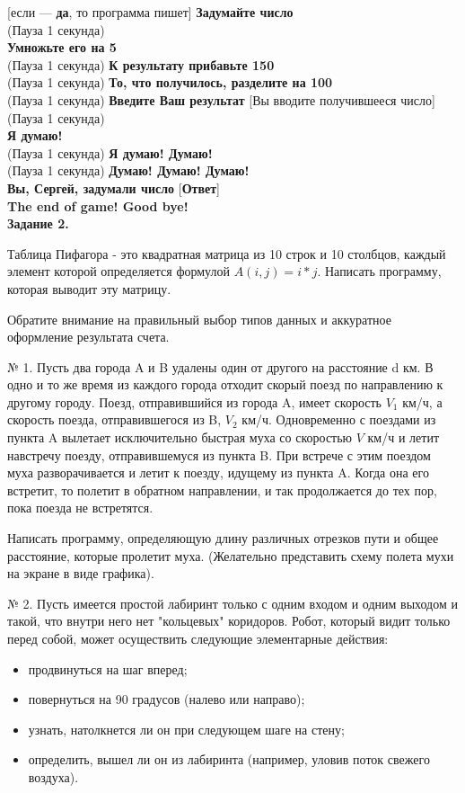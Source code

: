 [если ---  {\bf да}, то программа пишет] {\bf Задумайте число}\\
(Пауза 1 секунда)\\
 {\bf Умножьте его на 5}\\
(Пауза 1 секунда)  {\bf К результату прибавьте 150}\\
(Пауза 1 секунда)  {\bf То, что получилось, разделите на 100}\\
(Пауза 1 секунда)  {\bf Введите Ваш результат}  [Вы вводите получившееся число]\\
(Пауза 1 секунда)\\
 {\bf Я думаю!}\\
(Пауза 1 секунда)  {\bf Я думаю! Думаю!}\\
(Пауза 1 секунда)  {\bf Думаю! Думаю! Думаю!}\\
 {\bf Вы, Сергей, задумали число} [{\bf Ответ}]\\
 {\bf The end of game! Good bye!}\\

{\bf Задание 2.}

Таблица Пифагора - это квадратная матрица из 10 строк и 10 столбцов, каждый элемент которой определяется формулой $A(i, j) = i*j.$ 
Написать программу, которая выводит эту матрицу.

Обратите внимание на правильный выбор типов данных и аккуратное оформление результата счета.

№ 1. Пусть два города A и B удалены один от другого на расстояние d км. В одно и то же время из каждого города отходит скорый поезд по направлению к другому городу. Поезд, отправившийся из города A, имеет скорость $V_1$ км/ч, 
а скорость поезда, отправившегося из B, $V_2$ км/ч. Одновременно с поездами из пункта A вылетает исключительно быстрая муха со скоростью $V$ км/ч и летит навстречу поезду, отправившемуся из пункта B. 
При встрече с этим поездом муха разворачивается и летит к поезду, идущему из пункта A. Когда она его встретит, то полетит в обратном направлении, и так продолжается до тех пор, пока поезда не встретятся.

Написать программу, определяющую длину различных отрез­ков пути и общее расстояние, которые пролетит муха. (Желательно представить схему полета мухи на экране в виде графика).

№ 2. Пусть имеется простой лабиринт только с одним входом и одним выходом и такой, что внутри него нет "кольцевых" коридоров. Робот, который видит только перед собой, может осуще­ствить следующие элементарные действия:
\begin{itemize}
	\item продвинуться на шаг вперед;
	\item повернуться на 90 градусов (налево или направо);
	\item узнать, натолкнется ли он при следующем шаге на стену;
	\item определить, вышел ли он из лабиринта (например, уловив поток свежего воздуха).
\end{itemize}

